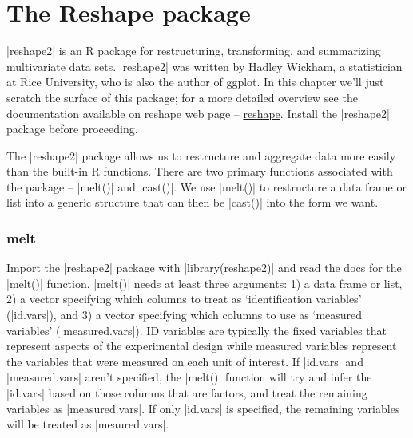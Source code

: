 

\section{The Reshape package}

|reshape2| is an R package for restructuring, transforming, and summarizing multivariate data sets. |reshape2| was written by Hadley Wickham, a statistician at Rice University, who is also the author of ggplot.  In this chapter we'll just scratch the surface of this package; for a more detailed overview see the documentation available on reshape web page -- \href{http://had.co.nz/reshape/}{reshape}. Install the |reshape2| package before proceeding.

The |reshape2| package allows us to restructure and aggregate data more easily than the built-in R functions.  There are two primary functions associated with the package -- |melt()| and |cast()|.  We use |melt()| to restructure a data frame or list into a generic structure that can then be |cast()| into the form we want.


\subsubsection{melt}

Import the |reshape2| package with |library(reshape2)| and read the docs for the |melt()| function.  |melt()| needs at least three arguments: 1) a data frame or list, 2) a vector specifying which columns to treat as `identification variables' (|id.vars|), and 3) a vector specifying which columns to use as `measured variables' (|measured.vars|).  ID variables are typically the fixed variables that represent aspects of the experimental design while measured variables represent the variables that were measured on each unit of interest.  If |id.vars| and |measured.vars| aren't specified, the |melt()| function will try and infer the |id.vars| based on those columns that are factors, and treat the remaining variables as |measured.vars|.  If only |id.vars| is specified, the remaining variables will be treated as |meaured.vars|.

